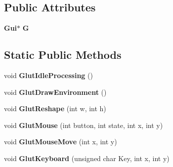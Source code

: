 \subsection*{Public Attributes}
\begin{CompactItemize}
\item 
{\bf Gui}$\ast$ {\bf G}
\end{CompactItemize}
\subsection*{Static Public Methods}
\begin{CompactItemize}
\item 
void {\bf Glut\-Idle\-Processing} ()
\item 
void {\bf Glut\-Draw\-Environment} ()
\item 
void {\bf Glut\-Reshape} (int w, int h)
\item 
void {\bf Glut\-Mouse} (int button, int state, int x, int y)
\item 
void {\bf Glut\-Mouse\-Move} (int x, int y)
\item 
void {\bf Glut\-Keyboard} (unsigned char Key, int x, int y)
\end{CompactItemize}
